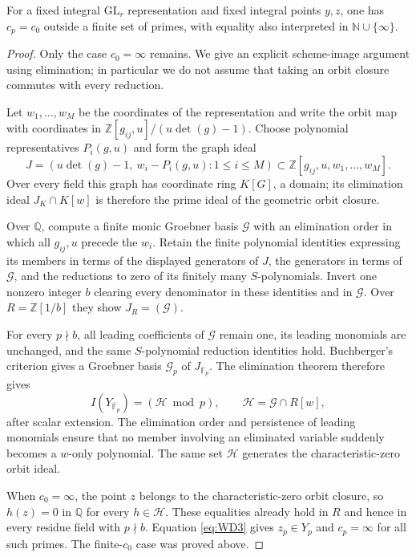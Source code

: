 \begin{theorem}
For a fixed integral $\mathrm{GL}_r$ representation and fixed integral
points $y,z$, one has $c_p=c_0$ outside a finite set of primes, with
equality also interpreted in $\mathbb N\cup\{\infty\}$.
\end{theorem}
\begin{proof}
Only the case $c_0=\infty$ remains.  We give an explicit
scheme-image argument using elimination; in particular we do not assume
that taking an orbit closure commutes with every reduction.

Let $w_1,\ldots,w_M$ be the coordinates of the representation and write
the orbit map with coordinates in
$\mathbb Z[g_{ij},u]/(u\det(g)-1)$.  Choose polynomial representatives
$P_i(g,u)$ and form the graph ideal
\[
 J=(u\det(g)-1,\ w_i-P_i(g,u):1\le i\le M)
 \subset\mathbb Z[g_{ij},u,w_1,\ldots,w_M].
\]
Over every field this graph has coordinate ring $K[G]$, a domain;
its elimination ideal $J_K\cap K[w]$ is therefore the prime ideal
of the geometric orbit closure.

Over $\mathbb Q$, compute a finite monic Groebner basis $\mathcal G$
with an elimination order in which all $g_{ij},u$ precede the $w_i$.
Retain the finite polynomial identities expressing its members in
terms of the displayed generators of $J$, the generators in terms of
$\mathcal G$, and the reductions to zero of its finitely many
$S$-polynomials.  Invert one nonzero integer $b$ clearing every
denominator in these identities and in $\mathcal G$.  Over
$R=\mathbb Z[1/b]$ they show $J_R=(\mathcal G)$.

For every $p\nmid b$, all leading coefficients of $\mathcal G$ remain
one, its leading monomials are unchanged, and the same $S$-polynomial
reduction identities hold.  Buchberger's criterion gives a Groebner
basis $\mathcal G_p$ of $J_{\mathbb F_p}$.  The elimination theorem
therefore gives
\begin{equation}
 I(Y_{\overline{\mathbb F}_p})
   =(\mathcal H\bmod p),\qquad
 \mathcal H=\mathcal G\cap R[w],
\label{eq:WD3}
\end{equation}
after scalar extension.  The elimination order and persistence of
leading monomials ensure that no member involving an eliminated
variable suddenly becomes a $w$-only polynomial.  The same set
$\mathcal H$ generates the characteristic-zero orbit ideal.

When $c_0=\infty$, the point $z$ belongs to the characteristic-zero
orbit closure, so $h(z)=0$ in $\mathbb Q$ for every $h\in\mathcal H$.
These equalities already hold in $R$ and hence in every residue field
with $p\nmid b$.  Equation \eqref{eq:WD3} gives $z_p\in Y_p$ and $c_p=\infty$
for all such primes.  The finite-$c_0$ case was proved above.
\end{proof}

